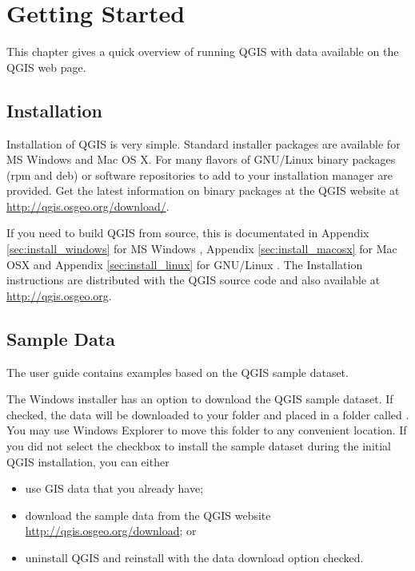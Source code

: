 
\section{Getting Started}\label{label_getstarted}


This chapter gives a quick overview of running QGIS with data available on the QGIS web page.

\subsection{Installation}\label{label_installation}

Installation of QGIS is very simple. Standard installer packages are
available for MS Windows and Mac OS X. For many flavors of GNU/Linux binary
packages (rpm and deb) or software repositories to add to your installation
manager are provided. Get the latest information on binary packages at the
QGIS website at \url{http://qgis.osgeo.org/download/}.

If you need to build QGIS from source, this is documentated in Appendix
\ref{sec:install_windows} for MS Windows \win, Appendix
\ref{sec:install_macosx} for Mac OSX \osx and Appendix
\ref{sec:install_linux} for GNU/Linux \nix. The Installation instructions are
distributed with the QGIS source code and also available at
\url{http://qgis.osgeo.org}.

\subsection{Sample Data}\label{label_sampledata}

The user guide contains examples based on the QGIS sample dataset. 

\win The Windows installer has an option to download the QGIS sample dataset.
If checked, the data will be downloaded to your 
folder and placed in a folder called . 
You may use Windows Explorer to move this folder to any convenient location.
If you did not select the checkbox to install the sample dataset
during the initial QGIS installation, you can either
\begin{itemize}
\item use GIS data that you already have;
\item download the sample data from the QGIS website
 \url{http://qgis.osgeo.org/download}; or
\item uninstall QGIS and reinstall with the data download option checked.
\end{itemize}

